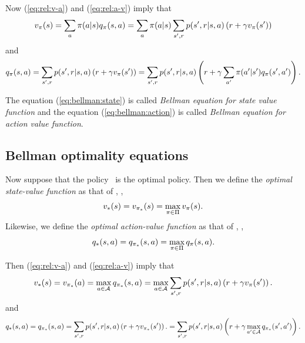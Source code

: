 Now (\ref{eq:rel:v-a}) and (\ref{eq:rel:a-v}) imply that
\begin{equation}
\label{eq:bellman:state}
v_{\pi}(s)
= \sum_a \pi(a|s) q_{\pi}(s,a)
= \sum_a \pi(a|s) \sum_{{s'}, r} p({s'}, r|s,a) \left( r + \gamma v_{\pi}({s'}) \right)
\end{equation}
and
\begin{equation}
\label{eq:bellman:action}
q_{\pi}(s,a)
= \sum_{{s'}, r} p({s'}, r|s,a) \left( r + \gamma v_{\pi}({s'}) \right)
= \sum_{{s'}, r} p({s'}, r|s,a) \left( r + \gamma \sum_{a'} \pi({a'}|{s'}) q_{\pi}({s'},{a'}) \right).
\end{equation}

The equation (\ref{eq:bellman:state}) is called \emph{Bellman equation for state value function}
and the equation (\ref{eq:bellman:action}) is called \emph{Bellman equation for action value function}.

\subsection{Bellman optimality equations}

Now suppose that the policy \optpol\ is the optimal policy.
Then we define the \emph{optimal state-value function}
as that of \optpol, \ie,
\begin{equation}
v_\ast(s) = v_{{\pi}_\ast}(s) = \max_{\pi\in\Pi} v_{\pi}(s).
\end{equation}
Likewise,
we define the \emph{optimal action-value function}
as that of \optpol, \ie,
\begin{equation}
q_\ast(s,a) = q_{{\pi}_\ast}(s,a) = \max_{\pi\in\Pi} q_{\pi}(s,a).
\end{equation}

Then (\ref{eq:rel:v-a}) and (\ref{eq:rel:a-v}) imply that
\begin{equation}
\label{eq:bellman:opt:state}
v_\ast(s) = v_{{\pi}_\ast}(a) = \max_{a\in\mathcal{A}} q_{{\pi}_\ast}(s,a)
= \max_{a\in\mathcal{A}} \sum_{{s'}, r} p({s'}, r|s,a) \left( r + \gamma v_{\pi}({s'}) \right).
\end{equation}
and
\begin{equation}
\label{eq:bellman:opt:action}
q_\ast(s,a)
= q_{{\pi}_\ast}(s,a)
= \sum_{{s'}, r} p({s'}, r|s,a) \left( r + \gamma v_{{\pi}_\ast}({s'}) \right).
= \sum_{{s'}, r} p({s'}, r|s,a) \left( r + \gamma \max_{{a'}\in\mathcal{A}}q_{{\pi}_\ast}({s'}, {a'}) \right).
\end{equation}

